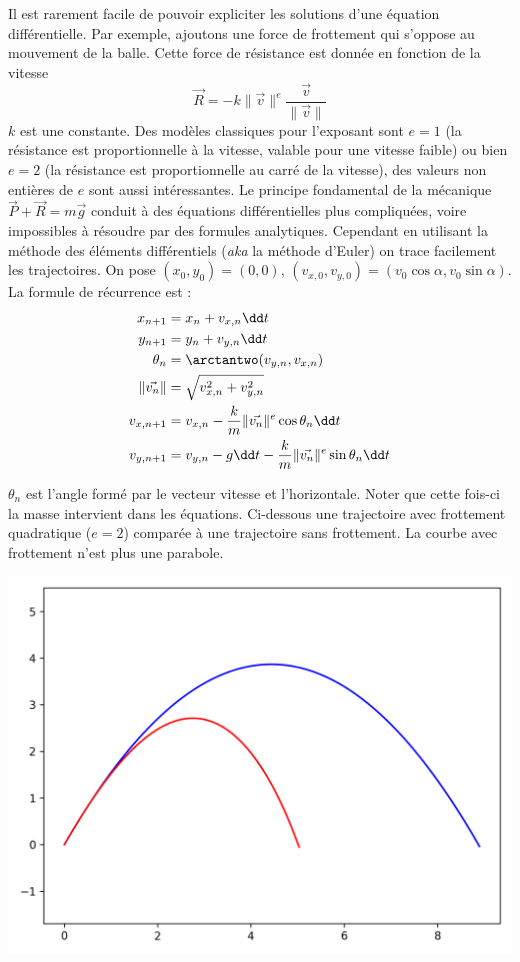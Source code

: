 \documentclass[11pt,class=report,crop=false]{standalone}
\begin{document}
Il est rarement facile de  pouvoir expliciter les solutions d'une équation différentielle. Par exemple, ajoutons une force de frottement qui s'oppose au mouvement de la balle. Cette force de résistance est donnée en fonction de la vitesse
$$\vec R = -k \| \vec v\| ^{e} \frac{\vec v}{\| \vec v \|}$$
$k$ est une constante. Des modèles classiques pour l'exposant sont $e=1$ (la résistance est proportionnelle à la vitesse, valable pour une vitesse faible) ou bien $e=2$ (la résistance est proportionnelle au carré de la vitesse), des valeurs non entières de $e$ sont aussi intéressantes.
Le principe fondamental de la mécanique $\vec P + \vec R = m\vec g$ conduit à des équations différentielles plus compliquées, voire impossibles à résoudre par des formules analytiques. Cependant en utilisant la méthode des éléments différentiels (\emph{aka} la méthode d'Euler) on trace facilement les trajectoires.
On pose $(x_0, y_0) = (0, 0)$, $(v_{x,0}, v_{y,0}) = (v_0 \cos \alpha, v_0 \sin \alpha)$.
La formule de récurrence est : 
\begin{align*}
	x_{n+1} &= x_n + v_{x,n} \dd t \\
	y_{n+1} &= y_n + v_{y,n} \dd t \\
	\theta_n &= \arctantwo(v_{y,n},v_{x,n}) \\ 
	\| \vec{v_n} \| &= \sqrt{v_{x,n}^2 + v_{y,n}^2} \\
	v_{x,n+1} &= v_{x,n} - \frac{k}{m} 	\| \vec{v_n} \|^e \cos \theta_n \dd t \\     
	v_{y,n+1} &= v_{y,n} - g \dd t - \frac{k}{m} \| \vec{v_n} \|^e \sin \theta_n \dd t \\
\end{align*}




$\theta_n$ est l'angle formé par le vecteur vitesse et l'horizontale.
Noter que cette fois-ci la masse intervient dans les équations.
Ci-dessous une trajectoire avec frottement quadratique ($e=2$) comparée à une trajectoire sans frottement. La courbe avec frottement n'est plus une parabole.

\begin{center}
	\includegraphics[scale=\myscale,scale=0.5]{figures/balle-frottements}
\end{center}
\end{document}
